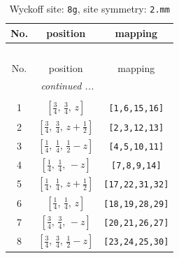 \documentclass[fleqn,8pt]{jsarticle}
\begin{document}
\begin{longtable}{ccc}
\caption{Wyckoff site: {\tt 8g}, site symmetry: {\tt 2.mm}}
 \\
 \hline \hline
No. & position & mapping \\ \hline \endfirsthead

\multicolumn{2}{l}{\tablename\ \thetable{}} \\
 \hline \hline
No. & position & mapping \\ \hline \endhead

 \hline \hline
\multicolumn{2}{r}{\footnotesize\it continued ...} \\ \endfoot

 \hline \hline
\multicolumn{2}{r}{} \\ \endlastfoot

1 & $\left[ \frac{3}{4},\, \frac{3}{4},\, z \right]$ & {\tt [1,6,15,16]} \\ \hline
2 & $\left[ \frac{3}{4},\, \frac{3}{4},\, z + \frac{1}{2} \right]$ & {\tt [2,3,12,13]} \\ \hline
3 & $\left[ \frac{1}{4},\, \frac{1}{4},\, \frac{1}{2} - z \right]$ & {\tt [4,5,10,11]} \\ \hline
4 & $\left[ \frac{1}{4},\, \frac{1}{4},\, - z \right]$ & {\tt [7,8,9,14]} \\ \hline
5 & $\left[ \frac{1}{4},\, \frac{1}{4},\, z + \frac{1}{2} \right]$ & {\tt [17,22,31,32]} \\ \hline
6 & $\left[ \frac{1}{4},\, \frac{1}{4},\, z \right]$ & {\tt [18,19,28,29]} \\ \hline
7 & $\left[ \frac{3}{4},\, \frac{3}{4},\, - z \right]$ & {\tt [20,21,26,27]} \\ \hline
8 & $\left[ \frac{3}{4},\, \frac{3}{4},\, \frac{1}{2} - z \right]$ & {\tt [23,24,25,30]} \\
\end{longtable}
\renewcommand{\arraystretch}{1.2}
\end{document}
